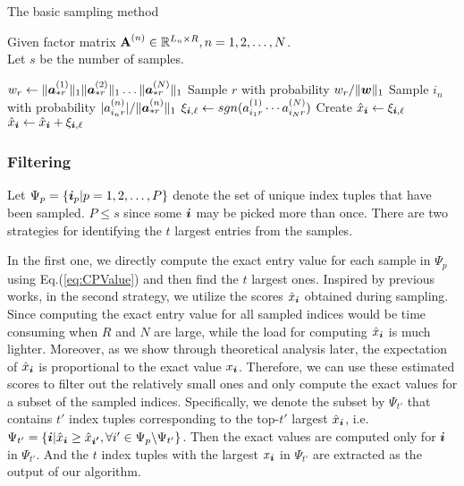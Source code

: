 \documentclass[10pt,journal,compsoc]{IEEEtran}
\newcommand{\Sca}[3]{{#1}^{(#2)}_{i_#2#3}}%
\newcommand{\anr}[2]{\Sca{a}{#1}{#2}}
\newcommand{\score}[1]{\xi_{\V{i},#1}}
\newcommand{\V}[1]{{\boldsymbol{{\MakeLowercase{#1}}}}}
\newcommand{\ColVec}[3]{\V{#1}^{(#2)}_{#3}}
\newcommand{\NormColA}[2]{\norm{\ColVec{a}{#1}{*#2}}{1}}
\newcommand{\ColVecA}[1]{\V{a}^{(#1)}_{*r}}
\newcommand{\coord}{(i_1,i_2,\ldots,i_N)}
\newcommand{\predx}{\hat{x}_{\V{i}}}
\newcommand{\M}[1]{{\textbf{{\MakeUppercase{#1}}}}}
\newcommand{\FacMat}[2]{\M{#1}^{(#2)}}
\newcommand{\norm}[2]{\|#1\|_{#2}}
\newcommand{\Eqn}[1]{Eq.(\ref{eq:#1})}
\begin{document}
\begin{algorithm}
	\caption{The basic sampling method}
	\label{alg:CoreSampling}
	Given factor matrix $\FacMat{A}{n}\in \mathbb{R}^{L_n\times R}, n = 1,2,\ldots,N$.\\
	Let $s$ be the number of samples.
	\begin{algorithmic}[1]
		\State $w_r \leftarrow \NormColA{1}{r}\NormColA{2}{r}\ldots\NormColA{N}{r}$
		\label{line:Weight}
		\EndFor
		\State Sample $r$ with probability $w_r/\norm{\V{W}}{1}$
		\label{line:CorePartition}
		\label{line:ItemPartitionFor}
		\State Sample $i_n$ with probability $|\anr{n}{r}|/\norm{\ColVecA{n}}{1}$
		\EndFor
		\label{line:ItemPartitionEnd}
		\State
		\label{line:Scoring}
		$\score{\ell} \leftarrow sgn(\anr{1}{r}\cdots\anr{N}{r})$
		\If {$\V{i}=\coord$ has not been sampled}
		\State  Create $\predx \leftarrow \score{\ell} $
		\Else
		\State $\predx \leftarrow \predx + \score{\ell}$
		\EndIf
		\EndFor
		\label{line:ScoringEnd}
	\end{algorithmic}
\end{algorithm}

\subsubsection{Filtering}

Let $\Psi_p = \{\V{i}_p|p = 1,2,\ldots,P\}$ denote the set of unique index tuples that have been sampled. $P\leq s$ since some $\V{i}$ may be picked more than once. There are two strategies for identifying the $t$ largest entries from the samples. 

In the first one, we directly compute the exact entry value for each sample in $\Psi_{p}$ using \Eqn{CPValue} and then find the $t$ largest ones. Inspired by previous works\cite{BaPiKoSe15,Cohen97}, in the second strategy, we utilize the scores $\predx$ obtained during sampling. Since computing the exact entry value for all sampled indices would be time consuming when $R$ and $N$ are large, while the load for computing $\predx$ is much lighter. Moreover, as we show through theoretical analysis later, the expectation of $\predx$ is proportional to the exact value $x_{\V{i}}$. Therefore, we can use these estimated scores to filter out the relatively small ones and only compute the exact values for a subset of the sampled indices. Specifically, we denote the subset by $\Psi_{t'}$ that contains $t'$ index tuples corresponding to the top-$t'$ largest $\predx$, i.e. $\Psi_{t'} = \{ \V{i} | \predx \geq \hat{x}_{\V{i'}},\forall i'\in \Psi_{p} \backslash \Psi_{t'}\}$. Then the exact values are computed only for $\V{i}$ in $\Psi_{t'}$. And the $t$ index tuples with the largest $x_{\V{i}}$  in $\Psi_{t'}$ are extracted as the output of our algorithm.
\end{document}
